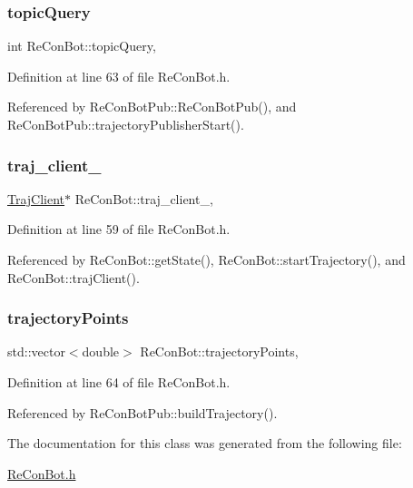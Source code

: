 \subsubsection{\texorpdfstring{topic\+Query}{topicQuery}}
{\footnotesize\ttfamily int Re\+Con\+Bot\+::topic\+Query\hspace{0.3cm}{\ttfamily [protected]}, {\ttfamily [inherited]}}



Definition at line 63 of file Re\+Con\+Bot.\+h.



Referenced by Re\+Con\+Bot\+Pub\+::\+Re\+Con\+Bot\+Pub(), and Re\+Con\+Bot\+Pub\+::trajectory\+Publisher\+Start().

\mbox{\label{class_re_con_bot_a14a35ad6ca284af7db7228d7872720d1}} 
\subsubsection{\texorpdfstring{traj\+\_\+client\+\_\+}{traj\_client\_}}
{\footnotesize\ttfamily \hyperlink{basic__arm_8cpp_a6fb8875093261cdc69e54d3ac7d5c301}{Traj\+Client}$\ast$ Re\+Con\+Bot\+::traj\+\_\+client\+\_\+\hspace{0.3cm}{\ttfamily [protected]}, {\ttfamily [inherited]}}



Definition at line 59 of file Re\+Con\+Bot.\+h.



Referenced by Re\+Con\+Bot\+::get\+State(), Re\+Con\+Bot\+::start\+Trajectory(), and Re\+Con\+Bot\+::traj\+Client().

\mbox{\label{class_re_con_bot_a7c59e136741800bf0734f659119aa5ee}} 
\subsubsection{\texorpdfstring{trajectory\+Points}{trajectoryPoints}}
{\footnotesize\ttfamily std\+::vector$<$double$>$ Re\+Con\+Bot\+::trajectory\+Points\hspace{0.3cm}{\ttfamily [protected]}, {\ttfamily [inherited]}}



Definition at line 64 of file Re\+Con\+Bot.\+h.



Referenced by Re\+Con\+Bot\+Pub\+::build\+Trajectory().



The documentation for this class was generated from the following file\+:\begin{DoxyCompactItemize}
\item 
\hyperlink{_re_con_bot_8h}{Re\+Con\+Bot.\+h}\end{DoxyCompactItemize}
